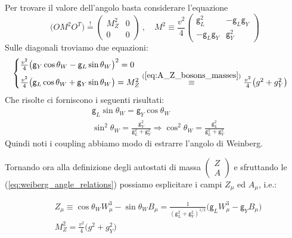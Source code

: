 \documentclass[../main.tex]{subfiles}
\begin{document}
Per trovare il valore dell'angolo basta considerare l'equazione 
\[
\big(O M^2 O^T \big) \overset{!}{=}
\begin{pmatrix}
        M_Z^2& 0   \\
        0    & 0
\end{pmatrix}~,\quad M^2 \equiv \frac{v^2}{4}
\begin{pmatrix}
    \mathsf g_L^2    & -\mathsf g_L\mathsf g_Y   \\
    -\mathsf g_L\mathsf g_Y    & \mathsf g_Y^2
\end{pmatrix}
\]
Sulle diagonali troviamo due equazioni:
\[
\begin{cases}
    \frac{v^2}{4} \big(\mathsf g_Y\cos\theta_W - \mathsf g_L\sin\theta_W\big)^2 = 0\\
    \frac{v^2}{4}\big(\mathsf g_L\cos\theta_W + \mathsf g_Y\sin\theta_W\big) = M_Z^2 \overset{(\ref{eq:A_Z_bosons_masses})}{\equiv} \frac{v^2}{4}\big(g^2+g_Y^2\big)
\end{cases}
\]
Che risolte ci forniscono i seguenti risultati:
\begin{equation}
    \boxed{
    \begin{aligned}
        &\mathsf g_L\sin\theta_W = \mathsf g_Y\cos\theta_W\\
        &\sin^2\theta_W = \frac{\mathsf g_Y^2}{\mathsf g_L^2 +\mathsf g_Y^2} \Rightarrow \cos^2\theta_W = \frac{\mathsf g_L^2}{\mathsf g_L^2 +\mathsf g_Y^2}
    \end{aligned}
    }
    \label{eq:weiberg_angle_relations}
\end{equation}
Quindi noti i coupling abbiamo modo di estrarre l'angolo di Weinberg.

Tornando ora alla definizione degli autostati di massa $\begin{pmatrix} Z \\ A \end{pmatrix}$ e sfruttando le (\ref{eq:weiberg_angle_relations}) possiamo esplicitare i campi $Z_\mu$ ed $A_\mu$, i.e.:

\begin{equation}
    \boxed{\begin{aligned}
        &Z_\mu \equiv \cos\theta_W W^3_\mu - \sin\theta_W B_\mu = \frac{1}{(\mathsf g_L^2 +\mathsf g_Y^2)^{1/2}}\big(\mathsf g_L W^3_\mu - \mathsf g_Y B_\mu\big) \\
        &M_Z^2 =\frac{v^2}{4}\big(g^2+g_Y^2\big)
    \end{aligned}}
    \label{eq:Z_bosonfield}
\end{equation}
\end{document}
